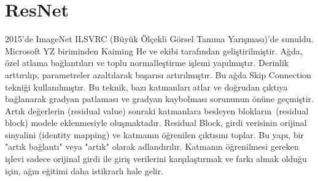 \section{ResNet}
2015'de ImageNet ILSVRC (Büyük Ölçekli Görsel Tanıma Yarışması)'de sunuldu. Microsoft YZ biriminden Kaiming He ve ekibi tarafından geliştirilmiştir. Ağda, özel atlama bağlantıları ve toplu normalleştirme işlemi yapılmıştır. Derinlik arttırılıp, parametreler azaltılarak başarısı artırılmıştır. Bu ağda Skip Connection tekniği kullanılmıştır. Bu teknik, bazı katmanları atlar ve doğrudan çıktıya bağlanarak gradyan patlaması ve gradyan kaybolması sorununun önüne geçmiştir. Artık değerlerin (residual value) sonraki katmanlara besleyen blokların (residual block) modele eklenmesiyle oluşmaktadır. Residual Block, girdi verisinin orijinal sinyalini (identity mapping) ve katmanın öğrenilen çıktısını toplar. Bu yapı, bir "artık bağlantı" veya "artık" olarak adlandırılır. Katmanın öğrenilmesi gereken işlevi sadece orijinal girdi ile giriş verilerini karşılaştırmak ve farkı almak olduğu için, ağın eğitimi daha istikrarlı hale gelir.

\newpage